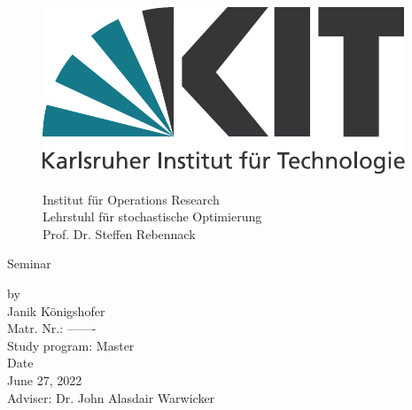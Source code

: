 \documentclass[a4paper,12pt]{article}
\begin{document}
\begin{titlepage}

\begin{figure}
\begin{minipage}{0.2\textwidth}
\includegraphics[scale=.6]{kit_logo_de_4c_positiv-rgb.pdf}
\end{minipage}
\hfill
\begin{minipage}{0.6\textwidth}
\begin{flushright}
Institut f\"ur Operations Research \\
Lehrstuhl f\"ur stochastische Optimierung \\
Prof. Dr. Steffen Rebennack \\
\medskip
\end{flushright}
\end{minipage}
\bigskip
\end{figure}

\vspace*{35pt}

\begin{center}
\Large{Seminar}    

\vspace*{35pt}

\fboxsep 40pt
\fboxrule 6pt

\vspace*{40pt}

\normalsize

by \\[4ex]

Janik K\"onigshofer \\
Matr. Nr.: -------\\
Study program: Master\\[4ex]

Date\\
June 27, 2022 \\[4ex]

Adviser: Dr. John Alasdair Warwicker

\end{center}

\end{titlepage}
\thispagestyle{empty}\cleardoublepage
\end{document}
